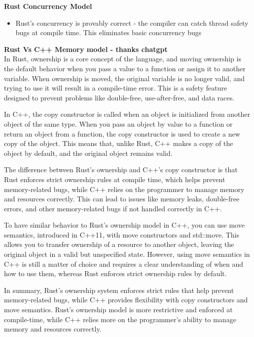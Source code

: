 \documentclass[10pt, landscape]{article}
\begin{document}
\begin{multicols}{4}
\textbf{Rust Concurrency Model} \\
\begin{itemize}
    \item Rust's concurrency is provably correct - the compiler can catch thread safety bugs at compile time. This eliminates basic concurrency bugs
\end{itemize}

\textbf{Rust Vs C++ Memory model - thanks chatgpt} \\
In Rust, ownership is a core concept of the language, and moving ownership is the default behavior when you pass a value to a function or assign it to another variable. When ownership is moved, the original variable is no longer valid, and trying to use it will result in a compile-time error. This is a safety feature designed to prevent problems like double-free, use-after-free, and data races.

In C++, the copy constructor is called when an object is initialized from another object of the same type. When you pass an object by value to a function or return an object from a function, the copy constructor is used to create a new copy of the object. This means that, unlike Rust, C++ makes a copy of the object by default, and the original object remains valid.

The difference between Rust's ownership and C++'s copy constructor is that Rust enforces strict ownership rules at compile time, which helps prevent memory-related bugs, while C++ relies on the programmer to manage memory and resources correctly. This can lead to issues like memory leaks, double-free errors, and other memory-related bugs if not handled correctly in C++.

To have similar behavior to Rust's ownership model in C++, you can use move semantics, introduced in C++11, with move constructors and std::move. This allows you to transfer ownership of a resource to another object, leaving the original object in a valid but unspecified state. However, using move semantics in C++ is still a matter of choice and requires a clear understanding of when and how to use them, whereas Rust enforces strict ownership rules by default.

In summary, Rust's ownership system enforces strict rules that help prevent memory-related bugs, while C++ provides flexibility with copy constructors and move semantics. Rust's ownership model is more restrictive and enforced at compile-time, while C++ relies more on the programmer's ability to manage memory and resources correctly.


\end{multicols}
\end{document}
